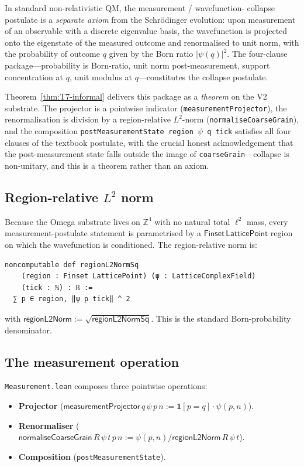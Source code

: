 \documentclass[11pt,a4paper,twoside]{article}
\theoremstyle{definition}
\newcommand{\Zbb}{\mathbb{Z}}
\newcommand{\code}[1]{\texttt{#1}}
\begin{document}
In standard non-relativistic QM, the measurement / wavefunction-
collapse postulate is a \emph{separate axiom} from the Schr\"odinger
evolution: upon measurement of an observable with a discrete
eigenvalue basis, the wavefunction is projected onto the eigenstate
of the measured outcome and renormalised to unit norm, with the
probability of outcome $q$ given by the Born ratio $|\psi(q)|^{2}$.
The four-clause package---probability is Born-ratio, unit norm
post-measurement, support concentration at $q$, unit modulus at
$q$---constitutes the collapse postulate.

Theorem~\ref{thm:T7-informal} delivers this package as a
\emph{theorem} on the V2 substrate. The projector is a pointwise
indicator (\code{measurementProjector}), the renormalisation is
division by a region-relative $L^{2}$-norm
(\code{normaliseCoarseGrain}), and the composition
\code{postMeasurementState\,region\,$\psi$\,q\,tick} satisfies all
four clauses of the textbook postulate, with the crucial honest
acknowledgement that the post-measurement state falls outside the
image of \code{coarseGrain}---collapse is non-unitary, and this is a
theorem rather than an axiom.

\subsection{Region-relative \texorpdfstring{$L^{2}$}{L2}
norm}\label{sec:measurement-norm}

Because the Omega substrate lives on $\Zbb^{4}$ with no natural total
$\ell^{2}$ mass, every measurement-postulate statement is parametrised
by a $\mathsf{Finset}\,\mathsf{LatticePoint}$ region on which the
wavefunction is conditioned. The region-relative norm is:
\begin{lstlisting}
noncomputable def regionL2NormSq
    (region : Finset LatticePoint) (ψ : LatticeComplexField)
    (tick : ℕ) : ℝ :=
  ∑ p ∈ region, ‖ψ p tick‖ ^ 2
\end{lstlisting}

with $\mathsf{regionL2Norm}:=\sqrt{\mathsf{regionL2NormSq}}$. This is
the standard Born-probability denominator.

\subsection{The measurement operation}\label{sec:measurement-op}

\code{Measurement.lean} composes three pointwise operations:
\begin{itemize}
\item \textbf{Projector}
  ($\mathsf{measurementProjector}\,q\,\psi\,p\,n:=\mathbf{1}[p=q]\cdot\psi(p,n)$).
\item \textbf{Renormaliser}
  ($\mathsf{normaliseCoarseGrain}\,R\,\psi\,t\,p\,n:=\psi(p,n)/\mathsf{regionL2Norm}\,R\,\psi\,t$).
\item \textbf{Composition} (\code{postMeasurementState}).
\end{itemize}
\end{document}
